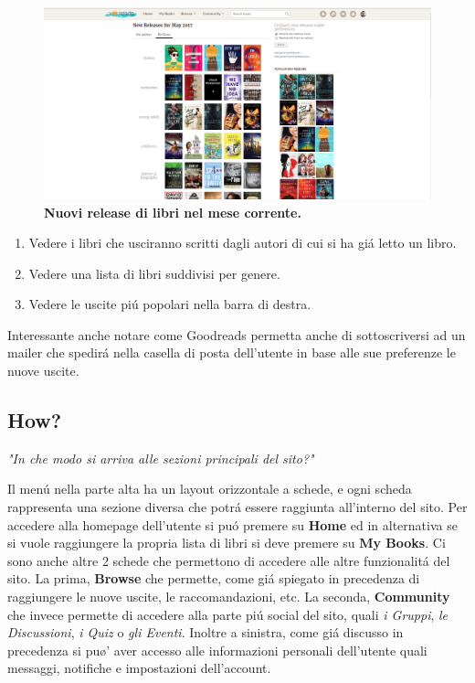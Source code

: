 \documentclass[12pt]{article}
\begin{document}
\begin{figure}
	\centering 
	\includegraphics[width=16.5cm]{resources/newproducts.png}
	\caption{\textbf{Nuovi release di libri nel mese corrente.}}
\end{figure}

\begin{enumerate}

\item Vedere i libri che usciranno scritti dagli autori di cui si ha gi\'a letto un libro.
\item Vedere una lista di libri suddivisi per genere.
\item Vedere le uscite pi\'u popolari nella barra di destra.
\end{enumerate}

\noindent Interessante anche notare come Goodreads permetta anche di sottoscriversi ad un mailer che spedir\'a nella casella di posta dell'utente in base alle sue preferenze le nuove uscite.

\subsection{How?}
\begin{center}
{\large \textit{"In che modo si arriva alle sezioni principali del sito?"}}
\end{center}

\noindent Il men\'u nella parte alta ha un layout orizzontale a schede, e ogni scheda rappresenta una sezione diversa che potr\'a essere raggiunta all'interno del sito. Per accedere alla homepage dell'utente si pu\'o premere su \textbf{Home} ed in alternativa se si vuole raggiungere la propria lista di libri si deve premere su \textbf{My Books}. Ci sono anche altre 2 schede che permettono di accedere alle altre funzionalit\'a del sito. La prima, \textbf{Browse} che permette, come gi\'a spiegato in precedenza di raggiungere le nuove uscite, le raccomandazioni, etc. La seconda, \textbf{Community} che invece permette di accedere alla parte pi\'u social del sito, quali \textit{i Gruppi}, \textit{le Discussioni}, \textit{i Quiz} o \textit{gli Eventi}. Inoltre a sinistra, come gi\'a discusso in precedenza si pu\o' aver accesso alle informazioni personali dell'utente quali messaggi, notifiche e impostazioni dell'account.
\end{document}

